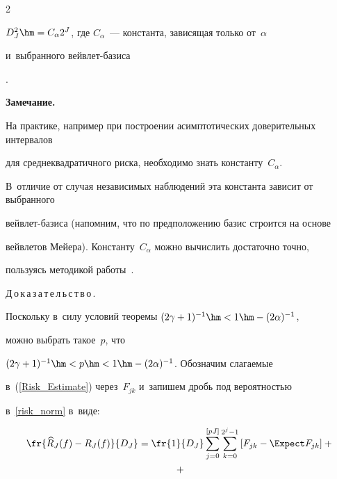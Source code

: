 \begin{multicols}{2}
{$D_J^2\hm=C_\alpha 2^J$, где  $C_\alpha$~--- константа, за\-ви\-ся\-щая только от~$\alpha$ 

и~выбранного вейв\-лет-ба\-зиса}.



\smallskip



\noindent

\textbf{Замечание.}\ 

На практике, например при по\-стро\-ении асимптотических доверительных интервалов 

для сред\-не\-квад\-ра\-тич\-но\-го рис\-ка, необходимо знать константу~$C_\alpha$. 

В~отличие от случая независимых наблюдений эта константа зависит от выбранного 

вейв\-лет-ба\-зи\-са (напомним, что по предположению базис строится на основе 

вейвлетов Мейера). Константу~$C_\alpha$ мож\-но вы\-чис\-лить достаточно точ\-но,

 пользуясь методикой работы~\cite{E15}.

 

 \smallskip



\noindent

Д\,о\,к\,а\,з\,а\,т\,е\,л\,ь\,с\,т\,в\,о\,. 

По\-сколь\-ку в~силу условий тео\-ре\-мы $(2\gamma+1)^{-1}\hm<1\hm-(2\alpha)^{-1}$, 

мож\-но выбрать такое~$p$, что

$(2\gamma+1)^{-1}\hm<p\hm<1\hm-(2\alpha)^{-1}$. Обозначим сла\-га\-емые 

в~(\ref{Risk_Estimate}) через~$F_{jk}$ и~запишем дробь под ве\-ро\-ят\-ностью 

в~\eqref{risk_norm} в~виде:



\vspace*{-4pt}



\noindent

\begin{multline}

\label{Two_Sums}

\fr{\widehat{R}_J(f)-R_J(f)}{D_J}=\fr{1}{D_J}\sum\limits_{j=0}^{[pJ]}

\sum\limits_{k=0}^{2^j-1}\left[F_{jk}-\Expect F_{jk}\right]+{}\\

{}+


\end{multline}
\end{multicols}
